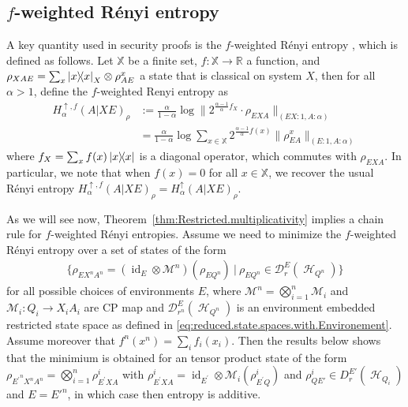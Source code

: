 \documentclass[11pt]{article}
\DeclareMathOperator{\id}{id}
\newcommand{\1}{\ensuremath{\mathbbm{1}}}
\theoremstyle{newdefinition}
\theoremstyle{newplain}
\theoremstyle{myplain}
\DeclareMathOperator{\cH}{\mathcal{H}}
\begin{document}
\subsection{$f$-weighted Rényi entropy}

A key quantity used in security proofs is the $f$-weighted Rényi entropy \cite{Himbeeck.2025}, which is defined as follows. Let $\mathbb X$ be a finite set, $f:\mathbb X\to \mathbb R$ a function, and $\rho_{XAE} = \sum_x \ketbra{x}_X \otimes \rho_{AE}^x $ a state that is classical on system $X$, then for all $\alpha>1$, define the $f$-weighted Renyi entropy as
\begin{align}
    H_\alpha^{\uparrow,f}(A|XE)_{\rho} 
        &:= \frac{\alpha}{1-\alpha} \log \| 2^{\tfrac{\alpha-1}{\alpha}f_X} \cdot \rho_{EXA}\|_{(EX:1,A:\alpha)}\\
        &= \frac{\alpha}{1-\alpha} \log \sum_{x\in \mathbb X} 2^{\tfrac{\alpha-1}{\alpha}f(x)} \|\rho_{EA}^x\|_{(E:1,A:\alpha)}
\end{align}
where $f_X = \sum_x f(x) \ketbra{x}$ is a diagonal operator, which commutes with $\rho_{EXA}$. In particular, we note that when $f(x)=0$ for all $x\in \mathbb X$, we recover the usual Rényi entropy $H_\alpha^{\uparrow,f}(A|XE)_{\rho} = H_\alpha^{\uparrow}(A|XE)_{\rho}$.

As we will see now, Theorem~\ref{thm:Restricted.multiplicativity} implies a chain rule for $f$-weighted Rényi entropies. Assume we need to minimize the $f$-weighted Rényi entropy over a set of states of the form
\begin{align}
    \{ \rho_{EX^nA^n} = (\id_E\otimes\mathcal{M}^n) (\rho_{EQ^n}) \: | \: \rho_{EQ^n} \in \mathcal D_r^E(\cH_{Q^n})\} 
\end{align} 
for all possible choices of environments $E$, where $\mathcal M^n = \bigotimes_{i=1}^n \mathcal M_i$ and $\mathcal M_i:Q_i\to X_iA_i$ are CP map and $\mathcal{D}^E_{r^n}(\cH_{Q^n})$ is an environment embedded restricted state space as defined in \eqref{eq:reduced.state.spaces.with.Environement}. Assume moreover that $f^n(x^n)= \sum_i f_i(x_i)$. Then the results below shows that the minimium is obtained for an tensor product state of the form $\rho_{{E^\prime}^nX^nA^n} = \bigotimes_{i=1}^n \rho_{E^\prime XA}^i$ with $\rho_{E^\prime XA}^i =  \id_{E^\prime}\otimes\mathcal{M}_i(\rho^i_{E^\prime Q})$ and $\rho_{QE'}^i\in  D_r^{E'}(\cH_{Q_i})$ and $E = {E'}^n$, in which case then entropy is additive. 
\end{document}
